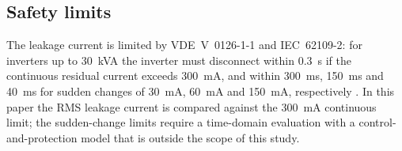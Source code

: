 \subsection{Safety limits}
The leakage current is limited by VDE~V~0126-1-1 and IEC~62109-2: for inverters up to 30~kVA the inverter must disconnect within 0.3~s if the continuous residual current exceeds 300~mA, and within 300~ms, 150~ms and 40~ms for sudden changes of 30~mA, 60~mA and 150~mA, respectively \cite{VDE0126,IEC62109}. In this paper the RMS leakage current is compared against the 300~mA continuous limit; the sudden-change limits require a time-domain evaluation with a control-and-protection model that is outside the scope of this study.

